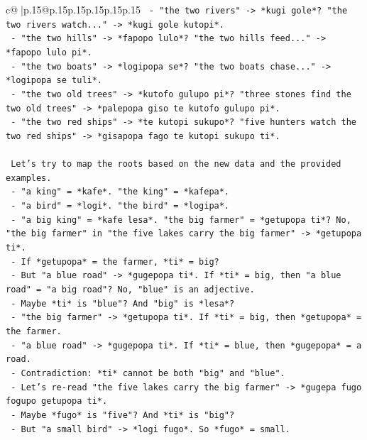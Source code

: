 \documentclass{article}
\begin{document}
{\begin{supertabular}{c@{$\;$}|p{.15\linewidth}@{}p{.15\linewidth}p{.15\linewidth}p{.15\linewidth}p{.15\linewidth}p{.15\linewidth}}
{{{\texttt{         {-} "the two rivers" {-}> *kugi gole*? "the two rivers watch..." {-}> *kugi gole kutopi*.} \\
\texttt{         {-} "the two hills" {-}> *fapopo lulo*? "the two hills feed..." {-}> *fapopo lulo pi*.} \\
\texttt{         {-} "the two boats" {-}> *logipopa se*? "the two boats chase..." {-}> *logipopa se tuli*.} \\
\texttt{         {-} "the two old trees" {-}> *kutofo gulupo pi*? "three stones find the two old trees" {-}> *palepopa giso te kutofo gulupo pi*.} \\
\texttt{         {-} "the two red ships" {-}> *te kutopi sukupo*? "five hunters watch the two red ships" {-}> *gisapopa fago te kutopi sukupo ti*.} \\
\\ 
\texttt{       Let's try to map the roots based on the new data and the provided examples.} \\
\texttt{       {-} "a king" = *kafe*. "the king" = *kafepa*.} \\
\texttt{       {-} "a bird" = *logi*. "the bird" = *logipa*.} \\
\texttt{       {-} "a big king" = *kafe lesa*. "the big farmer" = *getupopa ti*? No, "the big farmer" in "the five lakes carry the big farmer" {-}> *getupopa ti*.} \\
\texttt{         {-} If *getupopa* = the farmer, *ti* = big?} \\
\texttt{         {-} But "a blue road" {-}> *gugepopa ti*. If *ti* = big, then "a blue road" = "a big road"? No, "blue" is an adjective.} \\
\texttt{         {-} Maybe *ti* is "blue"? And "big" is *lesa*?} \\
\texttt{         {-} "the big farmer" {-}> *getupopa ti*. If *ti* = big, then *getupopa* = the farmer.} \\
\texttt{         {-} "a blue road" {-}> *gugepopa ti*. If *ti* = blue, then *gugepopa* = a road.} \\
\texttt{         {-} Contradiction: *ti* cannot be both "big" and "blue".} \\
\texttt{         {-} Let's re{-}read "the five lakes carry the big farmer" {-}> *gugepa fugo fogupo getupopa ti*.} \\
\texttt{           {-} Maybe *fugo* is "five"? And *ti* is "big"?} \\
\texttt{           {-} But "a small bird" {-}> *logi fugo*. So *fugo* = small.} \\
}}}
\end{supertabular}}
\end{document}
